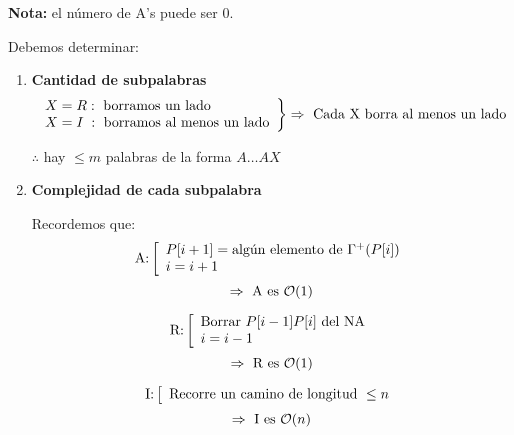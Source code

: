 \documentclass[12pt,a4paper]{report}
\begin{document}
			\par \textbf{Nota:} el número de A's puede ser 0.
			\vspace{5mm}
			\par Debemos determinar:
			\begin{enumerate}
				\item \textbf{Cantidad de subpalabras}
					\begin{equation*}
						\left.
						\begin{array}{l}
							X = R: \textup{ borramos un lado} \\
							X = I \; : \textup{ borramos al menos un lado}
						\end{array}
						\right\rbrace
						\Rightarrow \textup{ Cada X borra al menos un lado}
					\end{equation*}
					\begin{center}
						$\therefore$ hay $\leq m$ palabras de la forma $A \dotsc A X$
					\end{center}
				\item \textbf{Complejidad de cada subpalabra}
					\par Recordemos que:
					\begin{equation*}
						\textup{A:}
						\left[
						\begin{array}{l}
							P[i + 1] = \textup{algún elemento de } \Gamma^{+}(P[i]) \\
							i = i + 1
						\end{array}
						\right.
					\end{equation*}
					\[ \Rightarrow \textup{ A es } \mathcal{O}(1) \]

					\begin{equation*}
						\textup{R:}
						\left[
						\begin{array}{l}
							\textup{Borrar } P[i - 1]P[i] \textup{ del NA} \\
							i = i - 1
						\end{array}
						\right.
					\end{equation*}
					\[ \Rightarrow \textup{ R es } \mathcal{O}(1) \]

					\begin{equation*}
						\textup{I:}
						\left[
						\begin{array}{l}
							\textup{Recorre un camino de longitud } \leq n
						\end{array}
						\right.
					\end{equation*}
					\[ \Rightarrow \textup{ I es } \mathcal{O}(n) \]


\end{enumerate}
\end{document}
